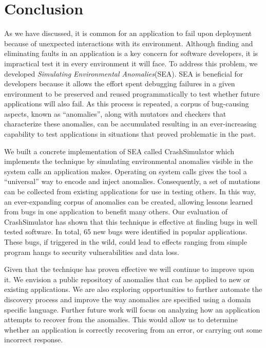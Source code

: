 \section{Conclusion}
\label{SEC:conclusion}

As we have discussed,
it is common for an application
to fail upon deployment because of unexpected interactions
with its environment.
Although finding and eliminating
faults in an application is a key concern for software developers, it is
impractical test it in every environment it will face.
To address this problem, we developed \textit{Simulating Environmental
Anomalies}(SEA).
SEA is beneficial for developers because it allows
the effort spent debugging failures in a given environment
to be preserved and reused programmatically to test whether
future applications will also fail.
As this process is repeated,
a corpus of bug-causing aspects,
known as ``anomalies'',
along with mutators and checkers that characterize these anomalies,
can be accumulated
resulting in an ever-increasing capability
to test applications in situations
that proved problematic in the past.

We built a concrete implementation of SEA
called CrashSimulator which implements
the technique by simulating environmental
anomalies visible in the system calls an application makes.
Operating on system calls gives the tool a ``universal'' way to
encode and inject anomalies. Consequently, a set of mutations can be
collected from existing applications for use in testing others.
In this way, an ever-expanding corpus of anomalies can be
created, allowing lessons learned from bugs in one application to benefit
many others.
Our evaluation of CrashSimulator
has shown that this technique is
effective at finding bugs in well tested software.
In total,
65 new bugs were identified in popular applications.
These bugs, if triggered in the wild,
could lead to effects ranging from simple program hangs
to security vulnerabilities and data loss.

Given that the technique has
proven effective we will continue to improve upon it.
We envision a public repository of anomalies
that can be applied to new or existing applications.
We are also exploring
opportunities to further automate the discovery process
and improve the way anomalies are specified using a
domain specific language.
Further future work
will focus on analyzing how an
application attempts
to recover from the anomalies.  This would allow
us to determine whether
an application is correctly recovering
from an error, or carrying out some incorrect response.
